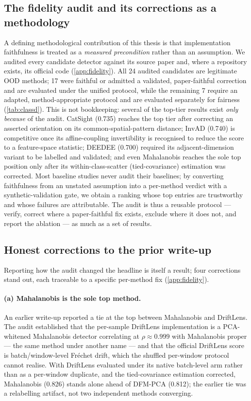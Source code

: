 \subsection{The fidelity audit and its corrections as a methodology}\label{sec:disc-audit}
A defining methodological contribution of this thesis is that implementation
faithfulness is treated as a \emph{measured precondition} rather than an
assumption. We audited every candidate detector against its source paper and,
where a repository exists, its official code (\cref{app:fidelity}). All
\num{24} audited candidates are legitimate OOD methods; \num{17} were faithful or
admitted a validated, paper-faithful correction and are evaluated under the unified
protocol, while the remaining \num{7} require an adapted, method-appropriate protocol
and are evaluated separately for fairness (\cref{tab:classd}). This is not bookkeeping:
several of the top-tier results exist \emph{only because} of the audit. CatSight
(\num{0.735}) reaches the top tier after correcting an asserted orientation on its
common-spatial-pattern distance; InvAD (\num{0.740}) is competitive once its
affine-coupling invertibility is recognised to reduce the score to a feature-space
statistic; DEEDEE (\num{0.700}) required its adjacent-dimension variant to be
labelled and validated; and even Mahalanobis reaches the sole top position only
after its within-class-scatter (tied-covariance) estimation was corrected. Most
baseline studies never audit their baselines; by converting faithfulness from an
unstated assumption into a per-method verdict with a synthetic-validation gate, we
obtain a ranking whose top entries are trustworthy and whose failures are
attributable. The audit is thus a reusable protocol --- verify, correct where a
paper-faithful fix exists, exclude where it does not, and report the ablation ---
as much as a set of results.

\subsection{Honest corrections to the prior write-up}\label{sec:disc-corrections}
Reporting how the audit changed the headline is itself a result; four corrections
stand out, each traceable to a specific per-method fix (\cref{app:fidelity}).
\paragraph{(a) Mahalanobis is the sole top method.}
An earlier write-up reported a tie at the top between Mahalanobis and DriftLens.
The audit established that the per-sample DriftLens implementation is a
PCA-whitened Mahalanobis detector correlating at $\rho \approx 0.999$ with
Mahalanobis proper --- the same method under another name --- and that the official
DriftLens score is batch/window-level Fr\'echet drift, which the shuffled
per-window protocol cannot realise. With DriftLens evaluated under its native
batch-level arm rather than as a per-window duplicate, and the tied-covariance
estimation corrected, Mahalanobis (\num{0.826}) stands alone ahead of DFM-PCA
(\num{0.812}); the earlier tie was a relabelling artifact, not two independent
methods converging.
